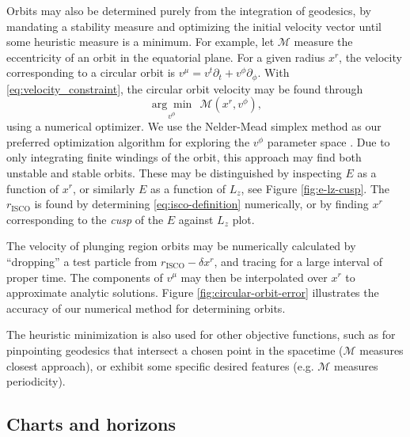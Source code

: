 Orbits may also be determined purely from the integration of geodesics, by mandating a stability measure and optimizing the initial velocity vector until some heuristic measure is a minimum. For example, let $\mathscr{M}$ measure the eccentricity of an orbit in the equatorial plane. For a given radius $x^r$, the velocity corresponding to a circular orbit is $v^\mu = v^t \partial_t + v^\phi \partial_\phi $. With \eqref{eq:velocity_constraint}, the circular orbit velocity may be found through
\begin{equation}
    \underset{v^\phi}{\arg \min}\ \ \mathscr{M}(x^r, v^\phi),
\end{equation}
using a numerical optimizer. We use the Nelder-Mead simplex method as our preferred optimization algorithm for exploring the $v^\phi$ parameter space \citep{nelder_simplex_1965}. Due to only integrating finite windings of the orbit, this approach may find both unstable and stable orbits. These may be distinguished by inspecting $E$ as a function of $x^r$, or similarly $E$ as a function of $L_z$, see Figure \ref{fig:e-lz-cusp}. The $r_\text{ISCO}$ is found by determining \eqref{eq:isco-definition} numerically, or by finding $x^r$ corresponding to the \textit{cusp} of the $E$ against $L_z$ plot.

The velocity of plunging region orbits may be numerically calculated by ``dropping'' a test particle from $r_\text{ISCO} -  \delta x^r$, and tracing for a large interval of proper time. The components of $v^\mu$ may then be interpolated over $x^r$ to approximate analytic solutions. Figure \ref{fig:circular-orbit-error} illustrates the accuracy of our numerical method for determining orbits.

The heuristic minimization is also used for other objective functions, such as for pinpointing geodesics that intersect a chosen point in the spacetime ($\mathscr{M}$ measures closest approach), or exhibit some specific desired features (e.g. $\mathscr{M}$ measures periodicity).







\subsection{Charts and horizons}

